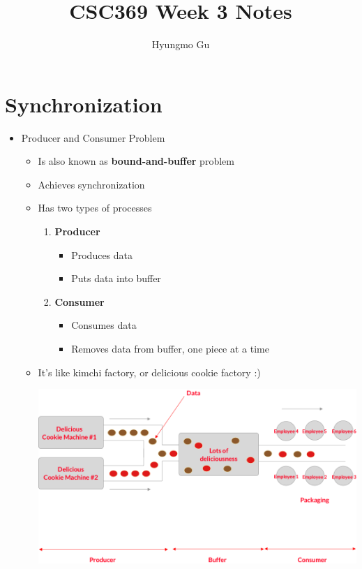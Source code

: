 \documentclass[12pt]{article}
\begin{document}
\title{CSC369 Week 3 Notes}
\author{Hyungmo Gu}
\maketitle

\bigskip

\section{Synchronization}

\bigskip
\begin{itemize}
    \item Producer and Consumer Problem
    \begin{itemize}
        \item Is also known as \textbf{bound-and-buffer} problem
        \item Achieves synchronization
        \item Has two types of processes
        \begin{enumerate}[1.]
            \item \textbf{Producer}
            \begin{itemize}
                \item Produces data
                \item Puts data into buffer
            \end{itemize}
            \item \textbf{Consumer}
            \begin{itemize}
                \item Consumes data
                \item Removes data from buffer, one piece at a time
            \end{itemize}
        \end{enumerate}
        \item It's like kimchi factory, or delicious cookie factory :)

        \begin{center}
        \includegraphics[width=\linewidth]{images/week_3_notes_1_1.png}
        \end{center}
    \end{itemize}


\end{itemize}
\end{document}
